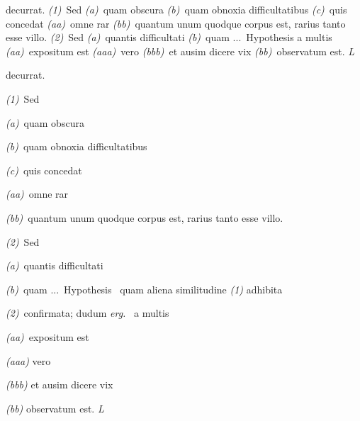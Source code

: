 {\footnotesize
{}\enskip decurrat. \textit{(1)}~Sed \textit{(a)}~quam obscura \textit{(b)}~quam obnoxia difficultatibus \textit{(c)}~quis concedat \textit{(aa)}~omne rar \textit{(bb)}~quantum unum quodque corpus est, rarius tanto esse villo. \textit{(2)}~Sed \textit{(a)}~quantis difficultati \textit{(b)}~quam \lbrack...\rbrack\  Hypothesis  a multis \textit{(aa)}~expositum est \textit{(aaa)}~vero \textit{(bbb)}~et ausim dicere vix \textit{(bb)}~observatum est. \textit{L}
\par
\medskip

\enskip decurrat.\par\noindent
\hspace{7mm}\textit{(1)}~Sed\par\noindent
\hspace{14mm}\textit{(a)}~quam obscura\par\noindent
\hspace{14mm}\textit{(b)}~quam obnoxia difficultatibus\par\noindent
\hspace{14mm}\textit{(c)}~quis concedat\par\noindent
\hspace{21mm}\textit{(aa)}~omne rar\par\noindent
\hspace{21mm}\textit{(bb)}~quantum unum quodque corpus est, rarius tanto esse villo.\par\noindent
\hspace{7mm}\textit{(2)}~Sed\par\noindent
\hspace{14mm}\textit{(a)}~quantis difficultati\par\noindent
\hspace{14mm}\textit{(b)}~quam \lbrack...\rbrack\ Hypothesis \textbar\ quam aliena similitudine \textit{(1)} adhibita\par\noindent
\hspace{8.25cm}\textit{(2)}~confirmata; dudum \textit{erg.} \textbar\ a
multis\par\noindent
\hspace{21mm}\textit{(aa)}~expositum est\par\noindent
\hspace{29mm}\textit{(aaa)} vero\par\noindent
\hspace{29mm}\textit{(bbb)} et ausim dicere vix\par\noindent
\hspace{21mm}\textit{(bb)} observatum est. \textit{L}
\par
}



